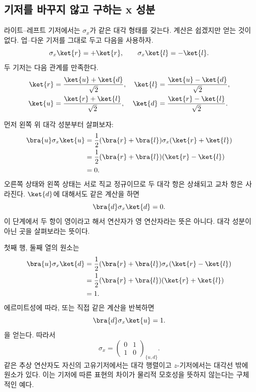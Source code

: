 \subsection{기저를 바꾸지 않고 구하는 x 성분}

라이트--레프트 기저에서는 \(\sigma_x\)가 같은 대각 형태를 갖는다. 계산은 쉽겠지만 얻는 것이 없다. 업--다운 기저를 그대로 두고 다음을 사용하자.
\begin{equation}
\sigma_x\ket{r}=+\ket{r},
\qquad
\sigma_x\ket{l}=-\ket{l}.
\label{eq:sigma-x-eigenvectors}
\end{equation}
두 기저는 다음 관계를 만족한다.
\begin{align}
\ket{r}&=\frac{\ket{u}+\ket{d}}{\sqrt2},&
\ket{l}&=\frac{\ket{u}-\ket{d}}{\sqrt2},\\
\ket{u}&=\frac{\ket{r}+\ket{l}}{\sqrt2},&
\ket{d}&=\frac{\ket{r}-\ket{l}}{\sqrt2}.
\label{eq:x-z-basis-relations}
\end{align}

먼저 왼쪽 위 대각 성분부터 살펴보자:
\begin{align}
\bra{u}\sigma_x\ket{u}
 &=\frac12(\bra{r}+\bra{l})\sigma_x(\ket{r}+\ket{l})\\
 &=\frac12(\bra{r}+\bra{l})(\ket{r}-\ket{l})\\
 &=0.
\end{align}
오른쪽 상태와 왼쪽 상태는 서로 직교 정규이므로 두 대각 항은 상쇄되고 교차 항은 사라진다. \(\ket{d}\)에 대해서도 같은 계산을 하면
\[
\bra{d}\sigma_x\ket{d}=0.
\]
이 단계에서 두 항이 영이라고 해서 연산자가 영 연산자라는 뜻은 아니다. 대각 성분이 아닌 곳을 살펴보라는 뜻이다.

첫째 행, 둘째 열의 원소는
\begin{align}
\bra{u}\sigma_x\ket{d}
 &=\frac12(\bra{r}+\bra{l})\sigma_x(\ket{r}-\ket{l})\\
 &=\frac12(\bra{r}+\bra{l})(\ket{r}+\ket{l})\\
 &=1.
\end{align}
에르미트성에 따라, 또는 직접 같은 계산을 반복하면
\[
\bra{d}\sigma_x\ket{u}=1.
\]
을 얻는다. 따라서
\begin{equation}
\boxed{
\sigma_x=
\begin{pmatrix}
0&1\\
1&0
\end{pmatrix}_{\{u,d\}}.}
\label{eq:sigma-x}
\end{equation}
같은 추상 연산자도 자신의 고유기저에서는 대각 행렬이고 \(z\)-기저에서는 대각선 밖에 원소가 있다. 이는 기저에 따른 표현의 차이가 물리적 모호성을 뜻하지 않는다는 구체적인 예다.

